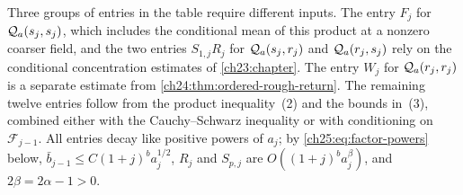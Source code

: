 Three groups of entries in the table require different inputs. The entry $F_j$ for $\mathcal Q_{a}(s_j,s_j)$, which includes the conditional mean of this product at a nonzero coarser field, and the two entries $S_{1,j}R_j$ for $\mathcal Q_{a}(s_j,r_j)$ and $\mathcal Q_{a}(r_j,s_j)$ rely on the conditional concentration estimates of \cref{ch23:chapter}. The entry $W_j$ for $\mathcal Q_{a}(r_j,r_j)$ is a separate estimate from \cref{ch24:thm:ordered-rough-return}. The remaining twelve entries follow from the product inequality~(2) and the bounds in~(3), combined either with the Cauchy--Schwarz inequality or with conditioning on $\mathcal F_{j-1}$. All entries decay like positive powers of $a_j$; by \eqref{ch25:eq:factor-powers} below, $\bar b_{j-1}\le C(1+j)^ba_j^{1/2}$, $R_j$ and $S_{p,j}$ are $O((1+j)^ba_j^\beta)$, and $2\beta=2\alpha-1>0$.

